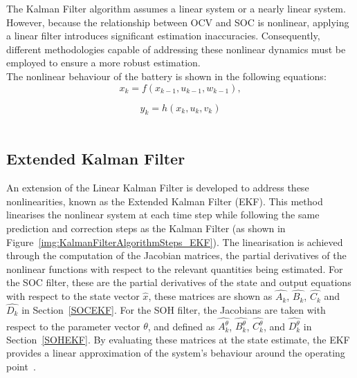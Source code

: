 

The Kalman Filter algorithm assumes a linear system or a nearly linear system. However, because the relationship between \acs{OCV} and \acs{SOC} 
is nonlinear, applying a linear filter introduces significant estimation inaccuracies. Consequently, different methodologies capable of 
addressing these nonlinear dynamics must be employed to ensure a more robust estimation.
\\
The nonlinear behaviour of the battery is shown in the following equations:
\begin{equation}
    x_k = f(x_{k-1}, u_{k-1}, w_{k-1}),
    \label{eq:nonlinearX}
\end{equation}

\begin{equation}
    y_k = h(x_k, u_k, v_k)
    \label{eq:nonlinearY}
\end{equation}
\\
\subsection{Extended Kalman Filter}

An extension of the Linear Kalman Filter is developed to address these nonlinearities, known as the Extended Kalman Filter (\acs{EKF}).
This method linearises the nonlinear system at each time step while following the same prediction and correction steps as the 
Kalman Filter (as shown in Figure~\ref{img:KalmanFilterAlgorithmSteps_EKF}). The linearisation is achieved through the computation of the 
Jacobian matrices, the partial derivatives of the nonlinear functions 
with respect to the relevant quantities being estimated. For the \acs{SOC} filter, these are the partial derivatives of the state and 
output equations with respect to the state vector $\hat{x}$, these matrices are shown as $\hat{A_k}$, $\hat{B_k}$, $\hat{C_k}$ and 
$\hat{D_k}$ in Section~\ref{SOCEKF}. For the \acs{SOH} filter, the Jacobians are taken with respect to the parameter vector $\theta$, 
and defined as $\hat{A_k^\theta}$, $\hat{B_k^\theta}$, $\hat{C_k^\theta}$, and $\hat{D_k^\theta}$ in Section~\ref{SOHEKF}.
By evaluating these matrices at the state estimate, the \acs{EKF} provides
a linear approximation of the system's behaviour around the operating point~\cite{plett2015battery}.

